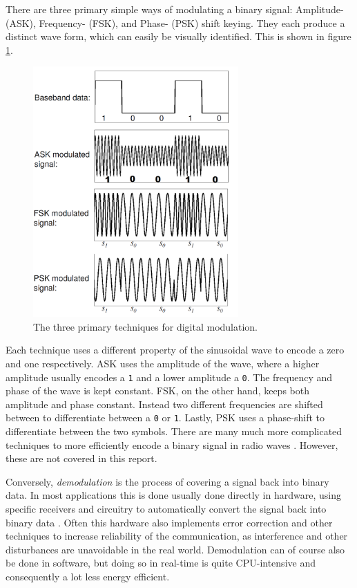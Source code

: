 There are three primary simple ways of modulating a binary signal: Amplitude- (ASK), Frequency- (FSK), and Phase- (PSK) shift keying. They each produce a distinct wave form, which can easily be visually identified. This is shown in figure \ref{fig:digital-modulation}.
\begin{figure}[!ht]
    \centering
    \includegraphics[width=0.7\textwidth]{images/6-pentesting/digital-modulation.png}
    \caption{The three primary techniques for digital modulation.}
    \label{fig:digital-modulation}
\end{figure}
Each technique uses a different property of the sinusoidal wave to encode a zero and one respectively. \gls{ASK} uses the amplitude of the wave, where a higher amplitude usually encodes a \texttt{1} and a lower amplitude a \texttt{0}. The frequency and phase of the wave is kept constant. \gls{FSK}, on the other hand, keeps both amplitude and phase constant. Instead two different frequencies are shifted between to differentiate between a \texttt{0} or \texttt{1}. Lastly, \gls{PSK} uses a phase-shift to differentiate between the two symbols. There are many much more complicated techniques to more efficiently encode a binary signal in radio waves \cite{rf-modulation}. However, these are not covered in this report.

Conversely, \textit{demodulation} is the process of covering a signal back into binary data. In most applications this is done usually done directly in hardware, using specific receivers and circuitry to automatically convert the signal back into binary data \cite{rf-modulation}. Often this hardware also implements error correction and other techniques to increase reliability of the communication, as interference and other disturbances are unavoidable in the real world. Demodulation can of course also be done in software, but doing so in real-time is quite CPU-intensive and consequently a lot less energy efficient.


